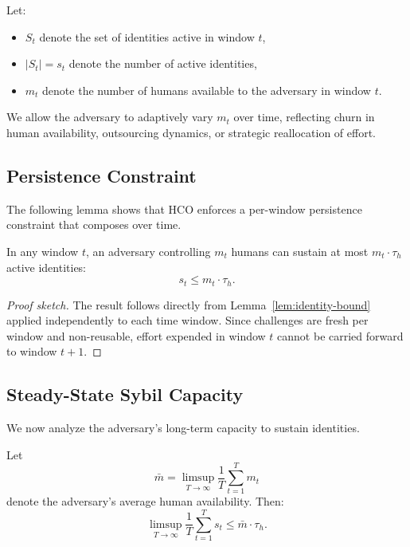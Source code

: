 \documentclass[sigconf,nonacm]{acmart}
\begin{document}
Let:
\begin{itemize}
	\item $S_t$ denote the set of identities active in window $t$,
	\item $|S_t| = s_t$ denote the number of active identities,
	\item $m_t$ denote the number of humans available to the adversary in window $t$.
\end{itemize}

We allow the adversary to adaptively vary $m_t$ over time, reflecting churn in human availability, outsourcing dynamics, or strategic reallocation of effort.

\subsection{Persistence Constraint}

The following lemma shows that HCO enforces a per-window persistence constraint that composes over time.

\begin{lemma}
	\label{lem:persistence}
	In any window $t$, an adversary controlling $m_t$ humans can sustain at most $m_t \cdot \tau_h$ active identities:
	\[
	s_t \le m_t \cdot \tau_h.
	\]
\end{lemma}

\begin{proof}[Proof sketch]
	The result follows directly from Lemma~\ref{lem:identity-bound} applied independently to each time window. Since challenges are fresh per window and non-reusable, effort expended in window $t$ cannot be carried forward to window $t+1$.
\end{proof}

\subsection{Steady-State Sybil Capacity}

We now analyze the adversary’s long-term capacity to sustain identities.

\begin{theorem}
	\label{thm:steady-state}
	Let
	\[
	\bar{m} = \limsup_{T \to \infty} \frac{1}{T} \sum_{t=1}^{T} m_t
	\]
	denote the adversary’s average human availability. Then:
	\[
	\limsup_{T \to \infty} \frac{1}{T} \sum_{t=1}^{T} s_t
	\le \bar{m} \cdot \tau_h .
	\]
\end{theorem}
\end{document}
